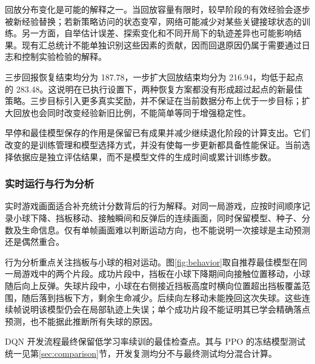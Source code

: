 回放分布变化是可能的解释之一。当回放容量有限时，较早阶段的有效经验会逐步被新经验替换；若新策略访问的状态变窄，网络可能减少对某些关键接球状态的训练。另一方面，自举估计误差、探索变化和不同开局下的轨迹差异也可能影响结果。现有汇总统计不能单独识别这些因素的贡献，因而回退原因仍属于需要通过日志和控制实验检验的解释。

三步回报恢复结束均分为 187.78，一步扩大回放结束均分为 216.94，均低于起点的 283.48。这说明在已执行设置下，两种恢复方案都没有形成超过起点的新最佳策略。三步目标引入更多真实奖励，并不保证在当前数据分布上优于一步目标；扩大回放也会同时改变经验新旧比例，不能简单等同于增强稳定性。

早停和最佳模型保存的作用是保留已有成果并减少继续退化阶段的计算支出。它们改变的是训练管理和模型选择方式，并没有使每一步更新都具备性能保证。当前选择依据应是独立评估结果，而不是模型文件的生成时间或累计训练步数。

\subsubsection{实时运行与行为分析}
实时游戏画面适合补充统计分数背后的行为解释。对同一局游戏，应按时间顺序记录小球下降、挡板移动、接触瞬间和反弹后的连续画面，同时保留模型、种子、分数及生命信息。仅有单帧画面难以判断运动方向，也不能说明一次接球是主动预测还是偶然重合。


行为分析重点关注挡板与小球的相对运动。图\ref{fig:behavior}取自推荐最佳模型在同一局游戏中的两个片段。成功片段中，挡板在小球下降期间向接触位置移动，小球随后向上反弹。失球片段中，小球在右侧接近挡板高度时横向位置超出挡板覆盖范围，随后落到挡板下方，剩余生命减少。后续向左移动未能挽回这次失球。这些连续帧说明该模型仍会在局部轨迹上失误；单个成功片段不能证明其已学会精确落点预测，也不能据此推断所有失球的原因。

DQN 开发流程最终保留低学习率续训的最佳检查点。其与 PPO 的冻结模型测试统一见第\ref{sec:comparison}节，开发复测均分不与最终测试均分混合计算。

\FloatBarrier
